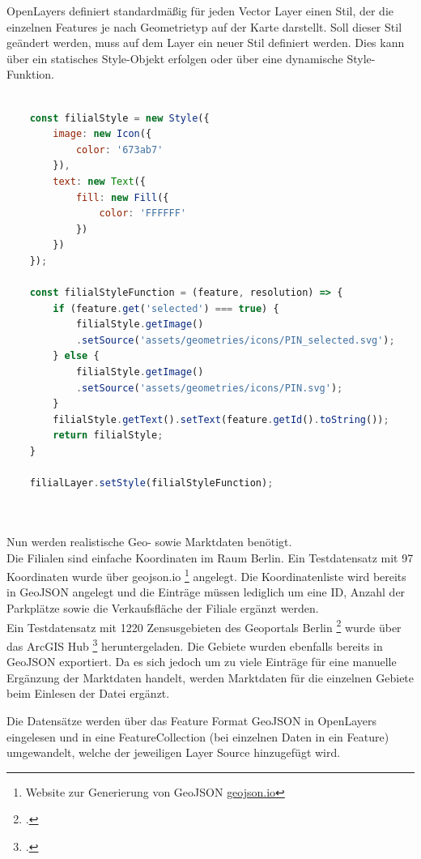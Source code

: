 OpenLayers definiert standardmäßig für jeden Vector Layer einen Stil, der die einzelnen Features je nach Geometrietyp auf der Karte darstellt. 
Soll dieser Stil geändert werden, muss auf dem Layer ein neuer Stil definiert werden.
Dies kann über ein statisches Style-Objekt erfolgen oder über eine dynamische Style-Funktion.

\begin{lstlisting}[language=JavaScript, label={code:filialStyle}, caption={Erstellen des Filialstyles}]
	
	const filialStyle = new Style({
		image: new Icon({
			color: '673ab7'
		}),
		text: new Text({
			fill: new Fill({
				color: 'FFFFFF'
			})	
		})
	});
	
	const filialStyleFunction = (feature, resolution) => {
		if (feature.get('selected') === true) {
			filialStyle.getImage()
			.setSource('assets/geometries/icons/PIN_selected.svg');
		} else {
			filialStyle.getImage()
			.setSource('assets/geometries/icons/PIN.svg');
		}
		filialStyle.getText().setText(feature.getId().toString());
		return filialStyle;
	}
	
	filialLayer.setStyle(filialStyleFunction);

	
\end{lstlisting}

Nun werden realistische Geo- sowie Marktdaten benötigt.\\
Die Filialen sind einfache Koordinaten im Raum Berlin.
Ein Testdatensatz mit 97 Koordinaten wurde über geojson.io \footnote{ Website zur Generierung von GeoJSON \href{geojson.io}{geojson.io}} angelegt.
Die Koordinatenliste wird bereits in GeoJSON angelegt und die Einträge müssen lediglich um eine ID, Anzahl der Parkplätze sowie die Verkaufsfläche der Filiale ergänzt werden.\\
Ein Testdatensatz mit 1220 Zensusgebieten des Geoportals Berlin \footcite{geoportal_berlin} wurde über das ArcGIS Hub \footcite{arcgis_verkehrszellen} heruntergeladen.
Die Gebiete wurden ebenfalls bereits in GeoJSON exportiert.
Da es sich jedoch um zu viele Einträge für eine manuelle Ergänzung der Marktdaten handelt, werden Marktdaten für die einzelnen Gebiete beim Einlesen der Datei ergänzt.

Die Datensätze werden über das Feature Format GeoJSON in OpenLayers eingelesen und in eine FeatureCollection (bei einzelnen Daten in ein Feature) umgewandelt, welche der jeweiligen Layer Source hinzugefügt wird.

